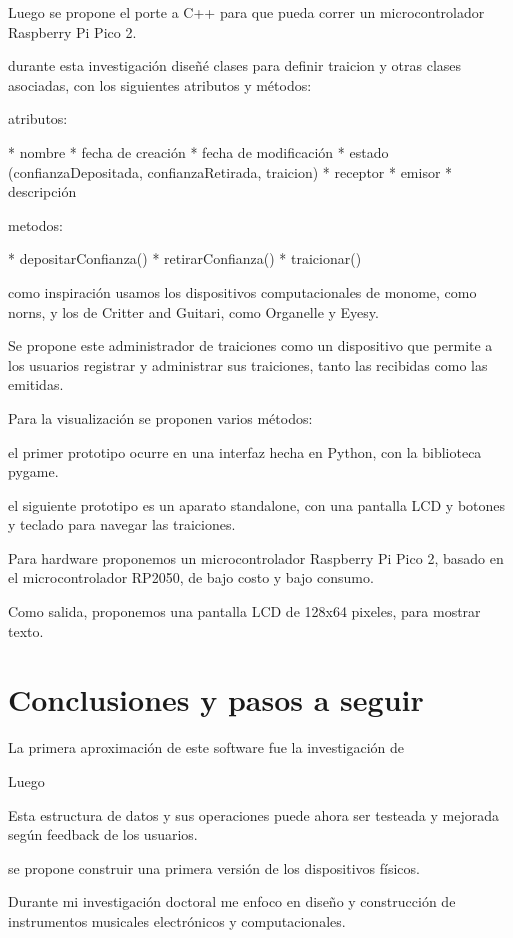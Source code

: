 \documentclass{article}
\begin{document}
Luego se propone el porte a C++ para que pueda correr un microcontrolador Raspberry Pi Pico 2.

durante esta investigación diseñé clases para definir traicion y otras clases asociadas, con los siguientes atributos y métodos:

atributos:

* nombre
* fecha de creación
* fecha de modificación
* estado (confianzaDepositada, confianzaRetirada, traicion)
* receptor
* emisor
* descripción

metodos:

* depositarConfianza()
* retirarConfianza()
* traicionar()

como inspiración usamos los dispositivos computacionales de monome, como norns, y los de Critter and Guitari, como Organelle y Eyesy.

Se propone este administrador de traiciones como un dispositivo que permite a los usuarios registrar y administrar sus traiciones, tanto las recibidas como las emitidas.

Para la visualización se proponen varios métodos:

el primer prototipo ocurre en una interfaz hecha en Python, con la biblioteca pygame.

el siguiente prototipo es un aparato standalone, con una pantalla LCD y botones y teclado para navegar las traiciones.

Para hardware proponemos un microcontrolador Raspberry Pi Pico 2, basado en el microcontrolador RP2050, de bajo costo y bajo consumo.

Como salida, proponemos una pantalla LCD de 128x64 pixeles, para mostrar texto.

\clearpage

\section{Conclusiones y pasos a seguir}


La primera aproximación de este software fue la investigación de

Luego

Esta estructura de datos y sus operaciones puede ahora ser testeada y mejorada según feedback de los usuarios.

se propone construir una primera versión de los dispositivos físicos.

Durante mi investigación doctoral me enfoco en diseño y construcción de instrumentos musicales electrónicos y computacionales.
\end{document}
